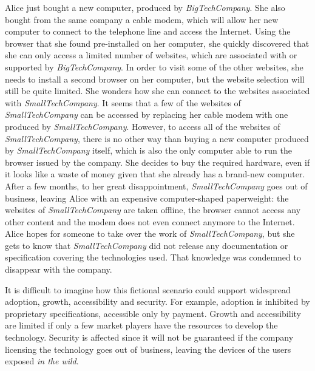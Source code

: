 \begin{framed}
Alice just bought a new computer, produced by \textit{BigTechCompany}. She also bought from the same company a cable modem, which will allow her new computer to connect to the telephone line and access the Internet. Using the browser that she found pre-installed on her computer, she quickly discovered that she can only access a limited number of websites, which are associated with or supported by \textit{BigTechCompany}. In order to visit some of the other websites, she needs to install a second browser on her computer, but the website selection will still be quite limited. She wonders how she can connect to the websites associated with \textit{SmallTechCompany}. It seems that a few of the websites of \textit{SmallTechCompany} can be accessed by replacing her cable modem with one produced by \textit{SmallTechCompany}. However, to access all of the websites of \textit{SmallTechCompany}, there is no other way than buying a new computer produced by \textit{SmallTechCompany} itself, which is also the only computer able to run the browser issued by the company.
She decides to buy the required hardware, even if it looks like a waste of money given that she already has a brand-new computer. After a few months, to her great disappointment, \textit{SmallTechCompany} goes out of business, leaving Alice with an expensive computer-shaped paperweight: the websites of \textit{SmallTechCompany} are taken offline, the browser cannot access any other content and the modem does not even connect anymore to the Internet. Alice hopes for someone to take over the work of \textit{SmallTechCompany}, but she gets to know that \textit{SmallTechCompany} did not release any documentation or specification covering the technologies used. That knowledge was condemned to disappear with the company.
\end{framed}

It is difficult to imagine how this fictional scenario could support widespread adoption, growth, accessibility and security. For example, adoption is inhibited by proprietary specifications, accessible only by payment. Growth and accessibility are limited if only a few market players have the resources to develop the technology. Security is affected since it will not be guaranteed if the company licensing the technology goes out of business, leaving the devices of the users exposed \textit{in the wild}.


